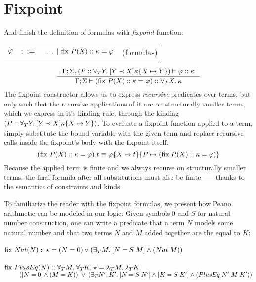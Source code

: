 \documentclass[english, mgr]{iithesis}
\renewcommand{\it}[1]{\textit{#1}}
\begin{document}
\section{Fixpoint}
\newcommand{\fix}[3]{\ensuremath{\text{fix }#1(#2)\ofkind#3=}}
And finish the definition of formulas with \it{fixpoint} function:

\begin{tabular}{rrlr}
$\varphi$ & $::=$ & $\ldots
               \bnfor \fix{\propv}{\termv}{\kind}{\formphi} $
    & (formulas)
\end{tabular}
$$
\inference{
  \cEnv;\kEnv, (\propv \ofkind \kForallTerm{Y} \kGuard{Y \cshlt \termv}{\kind\subst{\termv}{Y}})\vdash \formphi \ofkind \kind
}{
  \cEnv;\kEnv\vdash (\fix{\propv}{\termv}{\kind}{\formphi}) \ofkind \kForallTerm{\termv}{\kind}
}
$$
The fixpoint constructor allows us to express \it{recursive} predicates over terms,
but only such that the recursive applications of it are on structurally smaller terms,
which we express in it's kinding rule, through the kinding $(P :: \forall_T Y .\: [Y \prec X]{\kappa\{X\mapsto Y\}})$.
To evaluate a fixpoint function applied to a term, simply substitute the bound
variable with the given term and replace recursive calls inside the fixpoint's body with the fixpoint itself.
$$
(\fix{\propv}{\termv}{\kind}{\formphi})\fApp\term
\equiv
\formphi\subst{\termv}{\term}\subst{\propv}{(\fix{\propv}{\termv}{\kind}{\formphi})}
$$
Because the applied term is finite
and we always recurse on structurally smaller terms,
the final formula after all substitutions must also be finite
--— thanks to the semantics of constraints and kinds.

To familiarize the reader with the fixpoint formulas,
we present how Peano arithmetic can be modeled in our logic.
Given symbols $0$ and $S$ for natural number construction,
one can write a predicate that a term $N$ models some natural number
and that two terms $N$ and $M$ added together are the equal to $K$:\\ \\
$
\fix{Nat}{N}{\kProp}{(N \ceq 0) \vee (\fExistsTerm{M} \fCAnd{N \ceq {S \tapp M}} ({Nat}\fAppTerm{M}))}
$
\\ \\
$\fix{PlusEq}{N}{\kForallTerm{M}\kForallTerm{K}\kProp}{\fLamTerm{M}\fLamTerm{K}}$ \\
$\text{ }\qquad
  ([N = 0]\wedge{(M =K)}) \;\vee\;
   (\exists_T N', K' .\:[N = {S \; N'}]\wedge[K = {S \; K'}]\wedge{({PlusEq}\;{N'}\;{M}\;{K'})}
   )
$
\end{document}
